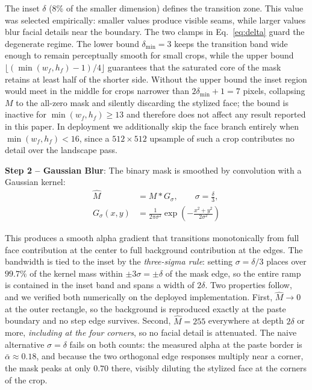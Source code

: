 \documentclass[journal]{IEEEtran}
\begin{document}
The inset $\delta$ (8\% of the smaller dimension) defines the transition zone. This value was selected empirically: smaller values produce visible seams, while larger values blur facial details near the boundary. The two clamps in Eq.~\eqref{eq:delta} guard the degenerate regime. The lower bound $\delta_{\min} = 3$ keeps the transition band wide enough to remain perceptually smooth for small crops, while the upper bound $\lfloor (\min(w_f,h_f)-1)/4 \rfloor$ guarantees that the saturated core of the mask retains at least half of the shorter side. Without the upper bound the inset region would meet in the middle for crops narrower than $2\delta_{\min}+1 = 7$ pixels, collapsing $M$ to the all-zero mask and silently discarding the stylized face; the bound is inactive for $\min(w_f,h_f) \geq 13$ and therefore does not affect any result reported in this paper. In deployment we additionally skip the face branch entirely when $\min(w_f,h_f) < 16$, since a $512 \times 512$ upsample of such a crop contributes no detail over the landscape pass.

\textbf{Step 2 -- Gaussian Blur}: The binary mask is smoothed by convolution with a Gaussian kernel:
\begin{equation}
\begin{aligned}
\hat{M} &= M * G_\sigma, \qquad \sigma = \frac{\delta}{3}, \\[2pt]
G_\sigma(x,y) &= \frac{1}{2\pi\sigma^2} \exp\!\left(-\frac{x^2 + y^2}{2\sigma^2}\right)
\end{aligned}
\label{eq:gaussian}
\end{equation}

This produces a smooth alpha gradient that transitions monotonically from full face contribution at the center to full background contribution at the edges. The bandwidth is tied to the inset by the \emph{three-sigma rule}: setting $\sigma = \delta/3$ places over $99.7\%$ of the kernel mass within $\pm 3\sigma = \pm\delta$ of the mask edge, so the entire ramp is contained in the inset band and spans a width of $2\delta$. Two properties follow, and we verified both numerically on the deployed implementation. First, $\hat{M} \to 0$ at the outer rectangle, so the background is reproduced exactly at the paste boundary and no step edge survives. Second, $\hat{M} = 255$ everywhere at depth $2\delta$ or more, \emph{including at the four corners}, so no facial detail is attenuated. The naive alternative $\sigma = \delta$ fails on both counts: the measured alpha at the paste border is $\bar{\alpha} \approx 0.18$, and because the two orthogonal edge responses multiply near a corner, the mask peaks at only $0.70$ there, visibly diluting the stylized face at the corners of the crop.
\end{document}
